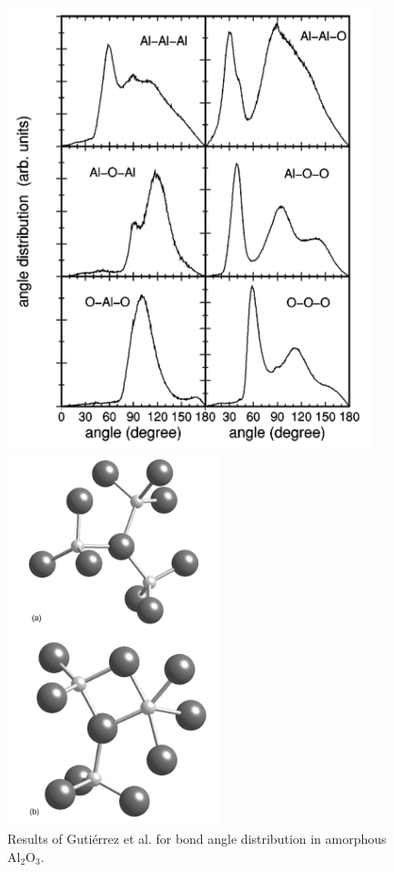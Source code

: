 \documentclass[3p,review,12pt]{elsarticle}
\begin{document}
\begin{figure}[H]
	\centering
	\begin{minipage}[b]{0.45\textwidth}
		\includegraphics[width=0.94\textwidth]{gutierrez1}
		\caption{Results of Guti\'errez et al. \cite{Gutierrez2002} for bond angle distribution in amorphous Al$_{2}$O$_{3}$.}
	\end{minipage}
	\hfill
	\begin{minipage}[b]{0.45\textwidth}
		\includegraphics[width=0.55\textwidth]{gutierrez2}

\end{minipage}
\end{figure}
\end{document}
